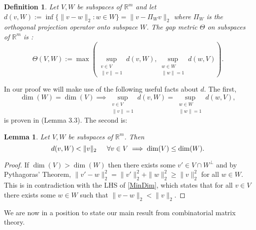 \documentclass[journal, onecolumn]{IEEEtran}
\newtheorem{lemma}{Lemma}
\newtheorem{definition}{Definition}
\begin{document}
\begin{definition}
Let $V, W$ be subspaces of $\mathbb{R}^m$ and let $d(v,W) := \inf\{\|v-w\|_2: w \in W\} = \|v - \Pi_W v\|_2$ where $\Pi_W$ is the orthogonal projection operator onto subspace $W$. The \emph{gap} metric $\Theta$ on subspaces of $\mathbb{R}^{m}$ is \cite{TheoryOfLinearOperatorsPage69}:
\begin{equation}\label{SubspaceMetric}
\Theta(V,W) := \max\left( \sup_{\substack{v \in V \\ \|v\| = 1}} d(v,W), \sup_{\substack{w \in W \\ \|w\| = 1}} d(w,V) \right).
\end{equation}
\end{definition}
%
In our proof we will make use of the following useful facts about $d$. The first, 
\begin{equation}\label{SubspaceMetricSameDim}
\dim(W) = \dim(V) \implies \sup_{\substack{v \in V \\ \|v\| = 1}}  d(v,W)  = \sup_{\substack{w \in W \\ \|w\| = 1}} d(w,V),
\end{equation}
%
is proven in \cite{Morris10} (Lemma 3.3). The second is:
\begin{lemma}\label{MinDimLemma}
Let $V, W$ be subspaces of $\mathbb{R}^{m}$. Then
\begin{equation}\label{MinDim}
d(v,W) < \|v\|_2 \indent \forall v \in V \implies \dim(V) \leq \dim(W).
\end{equation}
\end{lemma}

\begin{proof}
If $\dim(V) > \dim(W)$ then there exists some $v' \in V \cap W^\perp$ and by Pythagoras' Theorem, $\|v' - w\|_2^2 = \|v'\|_2^2 + \|w\|_2^2 \geq \|v\|_2^2$ for all $w \in W$. This is in contradiction with the LHS of \eqref{MinDim}, which states that for all $v \in V$ there exists some $w \in W$ such that $\|v - w\|_2 < \|v\|_2$.
\end{proof}

We are now in a position to state our main result from combinatorial matrix theory.

\end{document}
